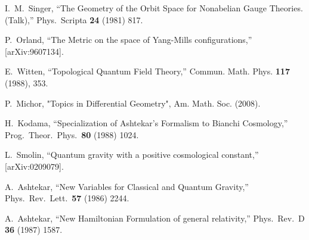 \documentclass[12pt]{article}
\begin{document}
\begin{thebibliography}{99}
 
  I.~M.~Singer,
  ``The Geometry of the Orbit Space for Nonabelian Gauge Theories. (Talk),''
  Phys.\ Scripta {\bf 24} (1981) 817.


  P.~Orland,
  ``The Metric on the space of Yang-Mills configurations,''
  [arXiv:9607134].









E.~Witten,
``Topological Quantum Field Theory,''
Commun. Math. Phys. \textbf{117} (1988), 353.





P.~Michor, "Topics in Differential Geometry", Am. Math. Soc. (2008).







  H.~Kodama,
  ``Specialization of Ashtekar's Formalism to Bianchi Cosmology,''
  Prog.\ Theor.\ Phys.\  {\bf 80} (1988) 1024.



  L.~Smolin,
  ``Quantum gravity with a positive cosmological constant,''
  [arXiv:0209079].




  A.~Ashtekar,
  ``New Variables for Classical and Quantum Gravity,''
  Phys.\ Rev.\ Lett.\  {\bf 57} (1986) 2244.

  A.~Ashtekar,
  ``New Hamiltonian Formulation of general relativity,''
  Phys.\ Rev.\  D {\bf 36} (1987) 1587.














\end{thebibliography}
\end{document}
